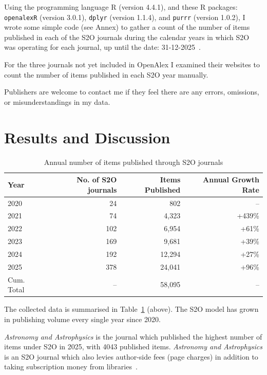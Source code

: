 \documentclass[10pt,a4paper]{article}
\begin{document}
\par
\medskip

Using the programming language R (version 4.4.1), and these R packages: \texttt{openalexR} (version 3.0.1), \texttt{dplyr} (version 1.1.4), and \texttt{purrr} (version 1.0.2), I wrote some simple code (see Annex) to gather a count of the number of items published in each of the S2O journals during the calendar years in which S2O was operating for each journal, up until the date: 31-12-2025~\citep{aria2024,wickhamDplyr2023,wickhamPurrr2023}.

For the three journals not yet included in OpenAlex I examined their websites to count the number of items published in each S2O year manually.

Publishers are welcome to contact me if they feel there are any errors, omissions, or misunderstandings in my data.

\section{Results and Discussion}

\begin{table}[htbp]
\centering
\setlength{\tabcolsep}{12pt}
\caption{Annual number of items published through S2O journals} \label{tab:s2o_items} \begin{tabular}{lrrr} \toprule Year & No. of S2O journals & Items Published & Annual Growth Rate \\ \midrule 2020 & 24 & 802 & -- \\ 2021 & 74 & 4,323 & +439\% \\ 2022 & 102 & 6,954 & +61\% \\ 2023 & 169 & 9,681 & +39\% \\ 2024 & 192 & 12,294 & +27\% \\ 2025 & 378 & 24,041 & +96\% \\ \midrule Cum. Total & -- & 58,095 & -- \\ \bottomrule \end{tabular} \end{table}

The collected data is summarised in Table~\ref{tab:s2o_items} (above). The S2O model has grown in publishing volume every single year since 2020.

\textit{Astronomy and Astrophysics} is the journal which published the highest number of items under S2O in 2025, with 4043 published items. \textit{Astronomy and Astrophysics} is an S2O journal which also levies author-side fees (page charges) in addition to taking subscription money from libraries~\citep{aandaPageCharges2026}.
\end{document}
